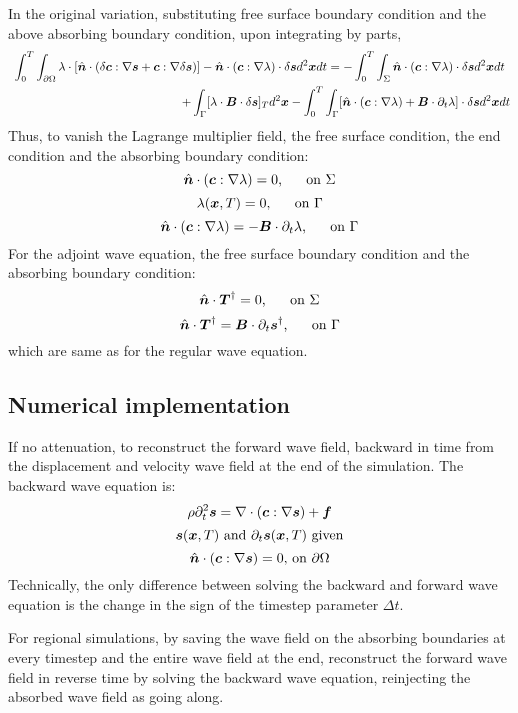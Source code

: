 In the original variation, substituting free surface boundary condition
and the above absorbing boundary condition, upon integrating by parts,
\begin{gather*}
  \int_0^T\int_{\partial\Omega}\lambda\cdot[\hat{\mbf n}\cdot(\delta\mbf c:\nabla\mbf s+\mbf c:\nabla\delta\mbf s)]-\hat{\mbf n}\cdot(\mbf c:\nabla\lambda)\cdot\delta\mbf sd^2\mbf xdt=-\int_0^T\int_\Sigma\hat{\mbf n}\cdot(\mbf c:\nabla\lambda)\cdot\delta\mbf sd^2\mbf xdt \\
  \hspace{50mm} +\int_\Gamma[\lambda\cdot\mbf B\cdot\delta\mbf s]_Td^2\mbf x-\int_0^T\int_\Gamma[\hat{\mbf n}\cdot(\mbf c:\nabla\lambda)+\mbf B\cdot\partial_t\lambda]\cdot\delta\mbf sd^2\mbf xdt
\end{gather*}
Thus, to vanish the Lagrange multiplier field, the free surface condition,
the end condition and the absorbing boundary condition:
\[ \hat{\boldsymbol{n}}\cdot(\boldsymbol{c}:\nabla\lambda)=0 \text{,\hspace{5mm} on } \Sigma \]
\[ \lambda(\boldsymbol{x},T)=0 \text{,\hspace{5mm} on } \Gamma \]
\[ \hat{\boldsymbol{n}}\cdot(\boldsymbol{c}:\nabla\lambda)=-\boldsymbol{B}\cdot\partial_t\lambda \text{,\hspace{5mm} on } \Gamma \]
For the adjoint wave equation, the free surface boundary condition
and the absorbing boundary condition:
\[ \hat{\boldsymbol{n}}\cdot\boldsymbol{T}^\dagger=0 \text{,\hspace{5mm} on } \Sigma \]
\[ \hat{\boldsymbol{n}}\cdot\boldsymbol{T}^\dagger=\boldsymbol{B}\cdot\partial_t\boldsymbol{s}^\dagger \text{,\hspace{5mm} on } \Gamma \]
which are same as for the regular wave equation.

\subsection{Numerical implementation}
If no attenuation, to reconstruct the forward wave field, backward in time from the displacement
and velocity wave field at the end of the simulation. The backward wave equation is:
\[ \rho\partial_t^2\boldsymbol{s}=\nabla\cdot(\boldsymbol{c}:\nabla\boldsymbol{s})+\boldsymbol{f} \]
\[ \boldsymbol{s}(\boldsymbol{x},T) \text{ and } \partial_t\boldsymbol{s}(\boldsymbol{x},T) \text{ given} \]
\[ \hat{\boldsymbol{n}}\cdot(\boldsymbol{c}:\nabla\boldsymbol{s})=0 \text{, on } \partial\Omega \]
Technically, the only difference between solving the backward and forward wave equation
is the change in the sign of the timestep parameter $\Delta t$.

For regional simulations, by saving the wave field on the absorbing boundaries at every timestep
and the entire wave field at the end, reconstruct the forward wave field in reverse time
by solving the backward wave equation, reinjecting the absorbed wave field as going along.

